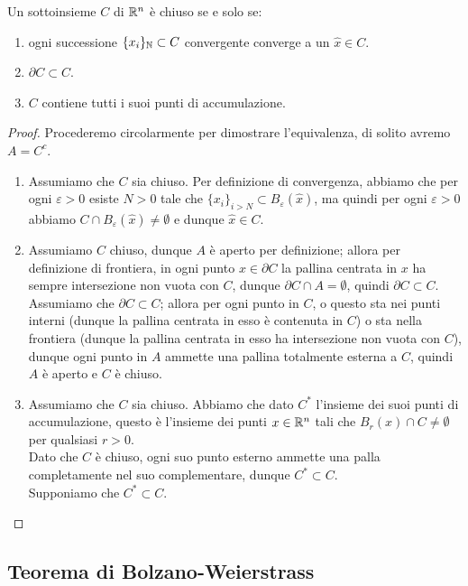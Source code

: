 \documentclass{article}
\begin{document}
\begin{theorem}{}{}
    Un sottoinsieme $C$ di $\mathbb{R}^n$ è chiuso se e solo se:\begin{enumerate}
        \item ogni successione $\{x_i\}_{\mathbb{N}} \subset C$ convergente converge a un $\hat{x} \in C$.
        \item $\partial C \subset C$.
        \item $C$ contiene tutti i suoi punti di accumulazione.
    \end{enumerate}
\end{theorem}
\begin{proof}
    Procederemo circolarmente per dimostrare l'equivalenza, di solito avremo $A = C^c$.\begin{enumerate}
        \item Assumiamo che $C$ sia chiuso. Per definizione di convergenza, abbiamo che per ogni $\varepsilon > 0$ esiste $N>0$ tale che $\{x_i\}_{i>N} \subset B_\varepsilon(\hat{x})$, ma quindi per ogni $\varepsilon > 0$ abbiamo $C \cap B_\varepsilon(\hat{x})\neq \emptyset$ e dunque $\hat{x} \in C$.
        \item Assumiamo $C$ chiuso, dunque $A$ è aperto per definizione; allora per definizione di frontiera, in ogni punto $x\in\partial C$ la pallina centrata in $x$ ha sempre intersezione non vuota con $C$, dunque $\partial C \cap A = \emptyset$, quindi $\partial C \subset C$. Assumiamo che $\partial C\subset C$; allora per ogni punto in $C$, o questo sta nei punti interni (dunque la pallina centrata in esso è contenuta in $C$) o sta nella frontiera (dunque la pallina centrata in esso ha intersezione non vuota con $C$), dunque ogni punto in $A$ ammette una pallina totalmente esterna a $C$, quindi $A$ è aperto e $C$ è chiuso.
        \item Assumiamo che $C$ sia chiuso. Abbiamo che dato $C^*$ l'insieme dei suoi punti di accumulazione, questo è l'insieme dei punti $x\in\mathbb{R}^n$ tali che $B_r(x)\cap C \neq \emptyset$ per qualsiasi $r>0$.\\ Dato che $C$ è chiuso, ogni suo punto esterno ammette una palla completamente nel suo complementare, dunque $C^* \subset C$.\\
        Supponiamo che $C^* \subset C$. 
    \end{enumerate}
\end{proof}

\subsection{Teorema di Bolzano-Weierstrass}
\end{document}
